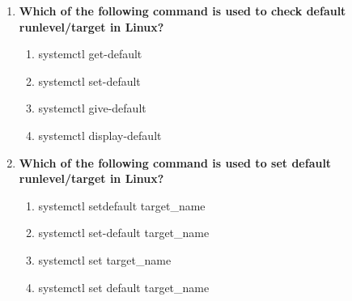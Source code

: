 \begin{flushleft}
\begin{enumerate}
		\item \textbf{Which of the following command is used to check default runlevel/target in Linux?}
		\begin{enumerate}[label=(\alph*)]
			\item systemctl get-default  %
			\item systemctl set-default
			\item systemctl give-default
			\item systemctl display-default
		\end{enumerate}
		\bigskip
		\bigskip
		\newpage
		\item \textbf{Which of the following command is used to set default runlevel/target in Linux?}
		\begin{enumerate}[label=(\alph*)]
			\item systemctl setdefault  target\_name
			\item systemctl set-default  target\_name  %
			\item systemctl set target\_name
			\item systemctl set default target\_name
		\end{enumerate}
		\bigskip
		\bigskip
		
	\end{enumerate}
\end{flushleft}

\newpage

\afterpage{\blankpage}